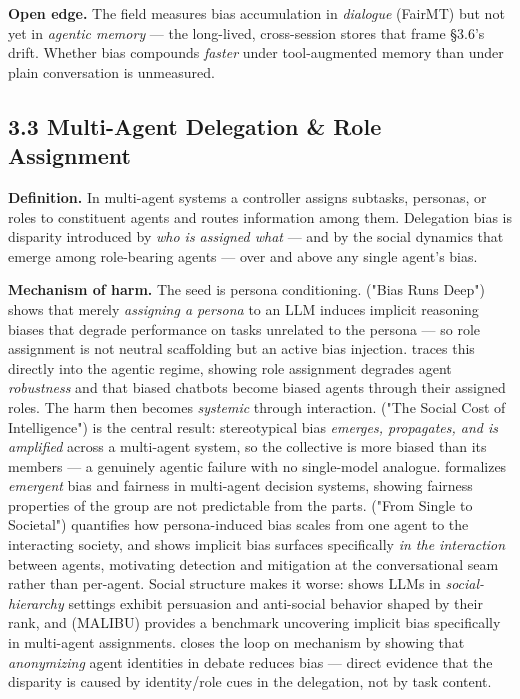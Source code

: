 \documentclass[sigconf,nonacm]{acmart}
\begin{document}
\textbf{Open edge.} The field measures bias accumulation in \emph{dialogue} (FairMT) but not yet in \emph{agentic memory} — the long-lived, cross-session stores that frame §3.6's drift. Whether bias compounds \emph{faster} under tool-augmented memory than under plain conversation is unmeasured.

\subsection{3.3 Multi-Agent Delegation & Role Assignment}

\textbf{Definition.} In multi-agent systems a controller assigns subtasks, personas, or roles to constituent agents and routes information among them. Delegation bias is disparity introduced by \emph{who is assigned what} — and by the social dynamics that emerge among role-bearing agents — over and above any single agent's bias.

\textbf{Mechanism of harm.} The seed is persona conditioning. \cite{gupta2023bias} ("Bias Runs Deep") shows that merely \emph{assigning a persona} to an LLM induces implicit reasoning biases that degrade performance on tasks unrelated to the persona — so role assignment is not neutral scaffolding but an active bias injection. \cite{cao2026from} traces this directly into the agentic regime, showing role assignment degrades agent \emph{robustness} and that biased chatbots become biased agents through their assigned roles. The harm then becomes \emph{systemic} through interaction. \cite{nguyen2025social} ("The Social Cost of Intelligence") is the central result: stereotypical bias \emph{emerges, propagates, and is amplified} across a multi-agent system, so the collective is more biased than its members — a genuinely agentic failure with no single-model analogue. \cite{madigan2025emergent} formalizes \emph{emergent} bias and fairness in multi-agent decision systems, showing fairness properties of the group are not predictable from the parts. \cite{li2025from} ("From Single to Societal") quantifies how persona-induced bias scales from one agent to the interacting society, and \cite{borah2024implicit} shows implicit bias surfaces specifically \emph{in the interaction} between agents, motivating detection and mitigation at the conversational seam rather than per-agent. Social structure makes it worse: \cite{campedelli2024want} shows LLMs in \emph{social-hierarchy} settings exhibit persuasion and anti-social behavior shaped by their rank, and \cite{mirza2025malibu} (MALIBU) provides a benchmark uncovering implicit bias specifically in multi-agent assignments. \cite{choi2025identity} closes the loop on mechanism by showing that \emph{anonymizing} agent identities in debate reduces bias — direct evidence that the disparity is caused by identity/role cues in the delegation, not by task content.
\end{document}
